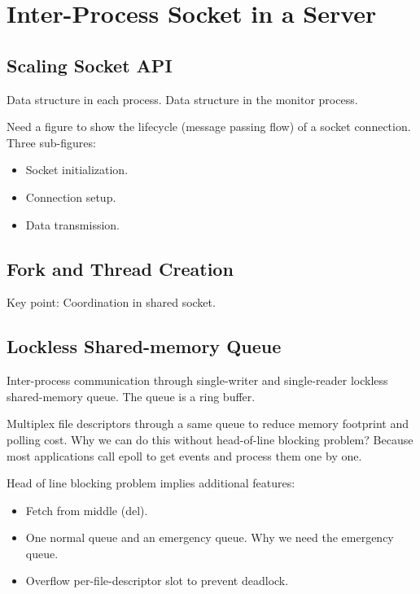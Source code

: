 \section{Inter-Process Socket in a Server}
\label{sec:intra-server}

\subsection{Scaling Socket API}

Data structure in each process. Data structure in the monitor process.

Need a figure to show the lifecycle (message passing flow) of a socket connection. Three sub-figures:

\begin{itemize}
	\item Socket initialization.
	\item Connection setup.
	\item Data transmission.
\end{itemize}


\subsection{Fork and Thread Creation}

Key point: Coordination in shared socket.

\subsection{Lockless Shared-memory Queue}

Inter-process communication through single-writer and single-reader lockless shared-memory queue. The queue is a ring buffer.

Multiplex file descriptors through a same queue to reduce memory footprint and polling cost. Why we can do this without head-of-line blocking problem? Because most applications call epoll to get events and process them one by one.


Head of line blocking problem implies additional features:
\begin{itemize}
	\item Fetch from middle (del).
	\item One normal queue and an emergency queue. Why we need the emergency queue.
	\item Overflow per-file-descriptor slot to prevent deadlock.
\end{itemize}

